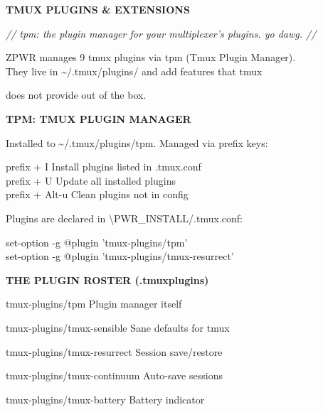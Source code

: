 \documentclass[11pt,a4paper,twoside]{book}
\begin{document}
\vspace{10pt}
{\large\bfseries\color{neoncyan} TMUX PLUGINS \& EXTENSIONS}\vspace{6pt}

{\small\itshape\color{dimtext} // tpm: the plugin manager for your multiplexer's plugins. yo dawg. //}

\begin{codebox}
ZPWR manages 9 tmux plugins via tpm (Tmux Plugin Manager).\\
They live in \textasciitilde{}/.tmux/plugins/ and add features that tmux\\
\end{codebox}

does not provide out of the box.


\vspace{12pt}
{\bfseries\color{neonyellow} TPM: TMUX PLUGIN MANAGER}\vspace{4pt}

Installed to \textasciitilde{}/.tmux/plugins/tpm. Managed via prefix keys:

\begin{codebox}
prefix + I       Install plugins listed in .tmux.conf\\
prefix + U       Update all installed plugins\\
prefix + Alt-u   Clean plugins not in config\\
\end{codebox}

Plugins are declared in \textbackslash{}PWR\_INSTALL/.tmux.conf:

\begin{codebox}
set-option -g @plugin 'tmux-plugins/tpm'\\
set-option -g @plugin 'tmux-plugins/tmux-resurrect'\\
\end{codebox}


\vspace{12pt}
{\bfseries\color{neonyellow} THE PLUGIN ROSTER (.tmuxplugins)}\vspace{4pt}

tmux-plugins/tpm                Plugin manager itself

tmux-plugins/tmux-sensible      Sane defaults for tmux

tmux-plugins/tmux-resurrect     Session save/restore

tmux-plugins/tmux-continuum      Auto-save sessions

tmux-plugins/tmux-battery        Battery indicator
\end{document}
